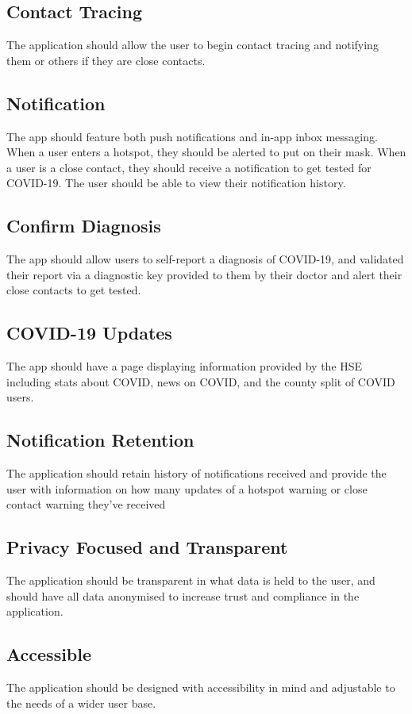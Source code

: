 \documentclass{scrreprt}
\begin{document}
\subsection{Contact Tracing}
The application should allow the user to begin contact tracing and notifying them or others if they are close contacts.

\subsection{Notification}
The app should feature both push notifications and in-app inbox messaging. When a user enters a hotspot, they should be alerted to put on their mask. When a user is a close contact, they should receive a notification to get tested for COVID-19. The user should be able to view their notification history.

\subsection{Confirm Diagnosis}
The app should allow users to self-report a diagnosis of COVID-19, and validated their report via a diagnostic key provided to them by their doctor and alert their close contacts to get tested.

\subsection{COVID-19 Updates}
The app should have a page displaying information provided by the HSE including stats about COVID, news on COVID, and the county split of COVID users.

\subsection{Notification Retention}
The application should retain history of notifications received and provide the user with information on how many updates of a hotspot warning or close contact warning they've received

\subsection{Privacy Focused and Transparent}
The application should be transparent in what data is held to the user, and should have all data anonymised to increase trust and compliance in the application.

\subsection{Accessible}
The application should be designed with accessibility in mind and adjustable to the needs of a wider user base. 
\end{document}
